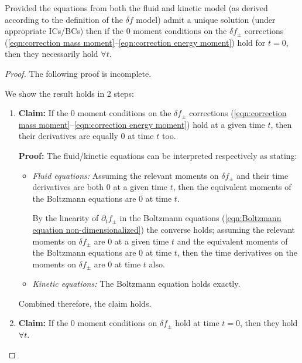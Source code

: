     \begin{conjecture}\label{con:delta f correction moments}
        Provided the equations from both the fluid and kinetic model (as derived according to the definition of the $\delta\! f$ model) admit a unique solution (under appropriate ICs/BCs) then if the 0 moment conditions on the $\delta\!f_{\pm}$ corrections (\ref{eqn:correction mass moment}--\ref{eqn:correction energy moment}) hold for $t  =  0$, then they necessarily hold $\forall t$.
    \end{conjecture}
    \begin{proof}
        The following proof is incomplete.
        
        We show the result holds in 2 steps:
        \begin{enumerate}
            \item  {\bf Claim:} If the 0 moment conditions on the $\delta\!f_{\pm}$ corrections (\ref{eqn:correction mass moment}--\ref{eqn:correction energy moment}) hold at a given time $t$, then their derivatives are equally 0 at time $t$ too.
            
            {\bf Proof:} The fluid/kinetic equations can be interpreted respectively as stating:
            \begin{itemize}
                \item  \emph{Fluid equations:} Assuming the relevant moments on $\delta\!f_{\pm}$ and their time derivatives are both 0 at a given time $t$, then the equivalent moments of the Boltzmann equations are 0 at time $t$.

                By the linearity of $\partial_{t}f_{\pm}$ in the Boltzmann equations (\ref{eqn:Boltzmann equation non-dimensionalized}) the converse holds; assuming the relevant moments on $\delta\!f_{\pm}$ are 0 at a given time $t$ and the equivalent moments of the Boltzmann equations are 0 at time $t$, then the time derivatives on the moments on $\delta\!f_{\pm}$ are 0 at time $t$ also.
                
                \item  \emph{Kinetic equations:} The Boltzmann equation holds exactly.
            \end{itemize}
            Combined therefore, the claim holds.

            \item  {\bf Claim:} If the 0 moment conditions on $\delta\!f_{\pm}$ hold at time $t  =  0$, then they hold $\forall t$.
            

\end{enumerate}
\end{proof}
